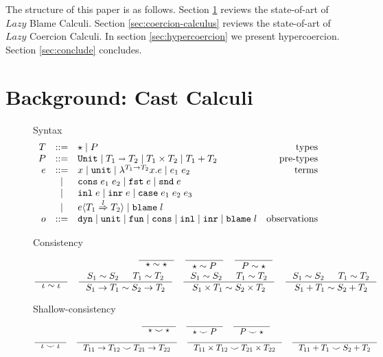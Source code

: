 \documentclass[acmsmall,review,anonymous]{acmart}\settopmatter{printfolios=true,printccs=false,printacmref=false}
\newcommand{\stxrule}[3]{#1 & ::= & #3 & \text{#2}\\}
\newcommand{\stxrulecont}[1]{& | & #1 & \\}
\newcommand{\plus}[0]{+}
\newcommand{\POOunit}[0]{\mathtt{Unit}}
\newcommand{\POOfun}[2]{#1 \shortrightarrow #2}
\newcommand{\POOprod}[2]{#1 \times #2}
\newcommand{\POOsum}[2]{#1 \plus #2}
\newcommand{\eOOvar}[1]{#1}
\newcommand{\eOOsole}[0]{\mathtt{unit}}
\newcommand{\eOOlam}[4]{\lambda^{#1\rightarrow{}#2}#3.#4}
\newcommand{\eOOapp}[2]{#1 \; #2}
\newcommand{\eOOcons}[2]{\mathtt{cons} \; #1 \; #2}
\newcommand{\eOOcar}[1]{\mathtt{fst} \; #1}
\newcommand{\eOOcdr}[1]{\mathtt{snd} \; #1}
\newcommand{\eOOinl}[1]{\mathtt{inl} \; #1}
\newcommand{\eOOinr}[1]{\mathtt{inr} \; #1}
\newcommand{\eOOcase}[3]{\mathtt{case} \; #1 \; #2 \; #3}
\newcommand{\eOOcast}[4]{#1 \langle \cOOcast{#2}{#3}{#4} \rangle}
\newcommand{\eOOblame}[1]{\mathtt{blame} \; #1}
\newcommand{\oOOinj}{\mathtt{dyn}}
\newcommand{\oOOsole}{\mathtt{unit}}
\newcommand{\oOOfun}{\mathtt{fun}}
\newcommand{\oOOcons}{\mathtt{cons}}
\newcommand{\oOOinl}{\mathtt{inl}}
\newcommand{\oOOinr}{\mathtt{inr}}
\newcommand{\oOOblame}[1]{\mathtt{blame} \; #1}
\newcommand{\cOOcast}[3]{#1 \overset{#2}{\Rightarrow} #3}
\begin{document}
The structure of this paper is as follows. 
Section \ref{sec:blame-calculus} reviews the state-of-art of $Lazy$ Blame 
Calculi. 
Section \ref{sec:coercion-calculus} reviews the state-of-art of $Lazy$ Coercion 
Calculi. 
In section \ref{sec:hypercoercion} we present hypercoercion.
Section \ref{sec:conclude} concludes.


\section{Background: Cast Calculi} \label{sec:blame-calculus}

\begin{figure}
	Syntax
	\[
	\begin{array}{rclr}
	\stxrule{T}{types}{
		\star \mid{}
		P
	}
	\stxrule{P}{pre-types}{
		\POOunit \mid
		\POOfun{T_1}{T_2} \mid
		\POOprod{T_1}{T_2} \mid
		\POOsum{T_1}{T_2}
	}
	\stxrule{e}{terms}{
		\eOOvar{x} \mid{}
		\eOOsole{} \mid{}
		\eOOlam{T_1}{T_2}{x}{e} \mid
		\eOOapp{e_1}{e_2}
	}
	\stxrulecont{
		\eOOcons{e_1}{e_2} \mid
		\eOOcar{e} \mid
		\eOOcdr{e}
	}
	\stxrulecont{
		\eOOinl{e} \mid
		\eOOinr{e} \mid
		\eOOcase{e_1}{e_2}{e_3}
	}
	\stxrulecont{
		\eOOcast{e}{T_1}{l}{T_2} \mid
		\eOOblame{l}
	}
	\stxrule{o}{observations}{
		\oOOinj \mid
		\oOOsole \mid
		\oOOfun \mid
		\oOOcons \mid
		\oOOinl \mid
		\oOOinr \mid
		\oOOblame{l}
	}
	\end{array}
	\]
	
	Consistency
	\begin{gather*}
	\inference{}{
		\star \sim \star
	} \quad
	\inference{}{
		\star \sim P
	} \quad
	\inference{}{
		P \sim \star
	} \\
	\inference{}{
		\iota \sim \iota
	} \quad
	\inference{
		S_1 \sim S_2 &
		T_1 \sim T_2
	}{
		S_1 \rightarrow T_1 \sim S_2 \rightarrow T_2
	} \quad
	\inference{
		S_1 \sim S_2 &
		T_1 \sim T_2
	}{
		S_1 \times T_1 \sim S_2 \times T_2
	} \quad
	\inference{
		S_1 \sim S_2 &
		T_1 \sim T_2
	}{
		S_1 \plus T_1 \sim S_2 \plus T_2
	}
	\end{gather*}
	
	Shallow-consistency
	\begin{gather*}
	\inference{}{
		\star \smile \star
	} \quad
	\inference{}{
		\star \smile P
	} \quad
	\inference{}{
		P \smile \star
	} \\
	\inference{}{
		\iota \smile \iota
	} \quad
	\inference{}{
		T_{11} \rightarrow T_{12} \smile T_{21} \rightarrow T_{22}
	} \quad
	\inference{}{
		T_{11} \times T_{12} \smile T_{21} \times T_{22}
	} \quad
	\inference{}{
	T_{11} \plus T_1 \smile S_2 \plus T_2
	}
	\end{gather*}
	

\end{figure}
\end{document}
